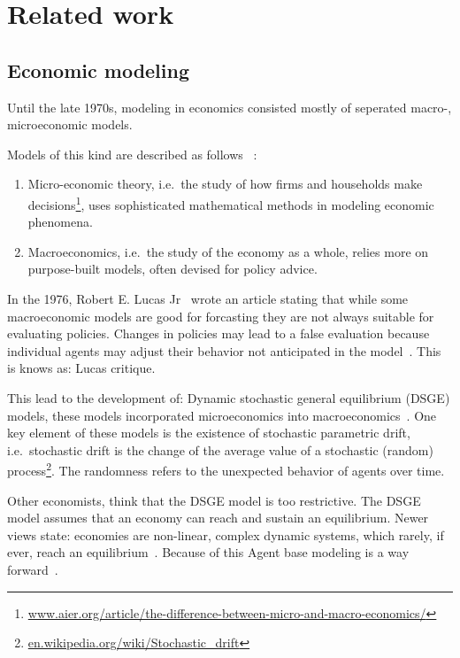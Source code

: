 \section{Related work}

\subsection{Economic modeling}\label{subsec:economic-modeling}
Until the late 1970s, modeling in economics consisted mostly of seperated macro-, microeconomic models.

Models of this kind are described as follows ~\cite{morgan2012models}:
\begin{enumerate}
  \item Micro-economic theory, i.e.\ the study of how firms and households make decisions\footnote{\url{www.aier.org/article/the-difference-between-micro-and-macro-economics/}}, uses sophisticated mathematical methods in modeling economic phenomena.
  \item Macroeconomics, i.e.\ the study of the economy as a whole\footnotemark[\value{footnote}], relies more on purpose-built models, often devised for policy advice.
\end{enumerate}

In the 1976, Robert E. Lucas Jr~\cite{lucas1976econometric} wrote an article stating that while some macroeconomic models are good for forcasting
they are not always suitable for evaluating policies.
Changes in policies may lead to a false evaluation because individual agents may adjust their behavior not anticipated in the model~\cite{HURTADO2014S12}.
This is knows as: Lucas critique.

This lead to the development of: Dynamic stochastic general equilibrium (DSGE) models, these models incorporated microeconomics into macroeconomics~\cite{moos2019facts}.
One key element of these models is the existence of stochastic parametric drift, i.e.\ stochastic drift is the change of the average value of a stochastic (random) process\footnote{\url{en.wikipedia.org/wiki/Stochastic_drift}}.
The randomness refers to the unexpected behavior of agents over time.

Other economists, think that the DSGE model is too restrictive.
The DSGE model assumes that an economy can reach and sustain an equilibrium.
Newer views state: economies are non-linear, complex dynamic systems, which rarely, if ever, reach an equilibrium~\cite{hamill2016agent}.
Because of this Agent base modeling is a way forward~\cite{hamill2016agent}.

